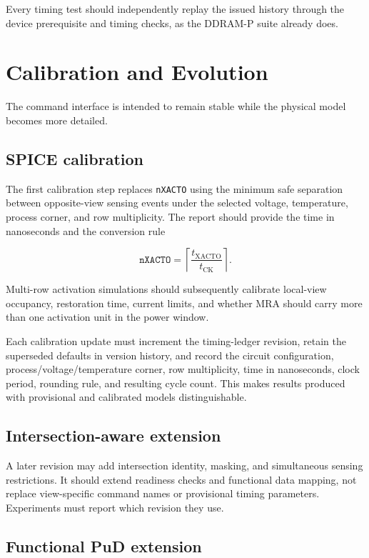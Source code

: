 \documentclass[9pt,twocolumn]{extarticle}
\newcommand{\param}[1]{\texttt{#1}}
\begin{document}
Every timing test should independently replay the issued history through the
device prerequisite and timing checks, as the DDRAM-P suite already does.

\section{Calibration and Evolution}

The command interface is intended to remain stable while the physical model
becomes more detailed.

\subsection{SPICE calibration}

The first calibration step replaces \param{nXACTO} using the minimum safe
separation between opposite-view sensing events under the selected voltage,
temperature, process corner, and row multiplicity. The report should provide
the time in nanoseconds and the conversion rule

\begin{equation}
  \param{nXACTO} = \left\lceil
    \frac{t_{\mathrm{XACTO}}}{t_{\mathrm{CK}}}
  \right\rceil.
\end{equation}

Multi-row activation simulations should subsequently calibrate local-view
occupancy, restoration time, current limits, and whether MRA should carry more
than one activation unit in the power window.

Each calibration update must increment the timing-ledger revision, retain the
superseded defaults in version history, and record the circuit configuration,
process/voltage/temperature corner, row multiplicity, time in nanoseconds,
clock period, rounding rule, and resulting cycle count. This makes results
produced with provisional and calibrated models distinguishable.

\subsection{Intersection-aware extension}

A later revision may add intersection identity, masking, and simultaneous
sensing restrictions. It should extend readiness checks and functional data
mapping, not replace view-specific command names or provisional timing
parameters. Experiments must report which revision they use.

\subsection{Functional PuD extension}
\end{document}
